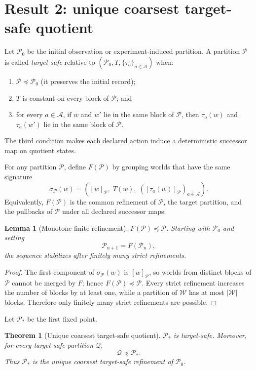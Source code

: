 \documentclass[11pt]{article}
\newtheorem{theorem}{Theorem}
\newtheorem{lemma}{Lemma}
\newcommand{\W}{\mathcal{W}}
\newcommand{\A}{\mathcal{A}}
\newcommand{\Pcal}{\mathcal{P}}
\newcommand{\Qcal}{\mathcal{Q}}
\begin{document}
\section{Result 2: unique coarsest target-safe quotient}
Let $\Pcal_0$ be the initial observation or experiment-induced partition. A partition $\Pcal$ is called \emph{target-safe} relative to $(\Pcal_0,T,\{\tau_a\}_{a\in\A})$ when:
\begin{enumerate}
\item $\Pcal\preceq\Pcal_0$ (it preserves the initial record);
\item $T$ is constant on every block of $\Pcal$; and
\item for every $a\in\A$, if $w$ and $w'$ lie in the same block of $\Pcal$, then $\tau_a(w)$ and $\tau_a(w')$ lie in the same block of $\Pcal$.
\end{enumerate}
The third condition makes each declared action induce a deterministic successor map on quotient states.

For any partition $\Pcal$, define $F(\Pcal)$ by grouping worlds that have the same signature
\[
\sigma_{\Pcal}(w)=
\left(
[w]_{\Pcal},\;T(w),\;([\tau_a(w)]_{\Pcal})_{a\in\A}
\right).
\]
Equivalently, $F(\Pcal)$ is the common refinement of $\Pcal$, the target partition, and the pullbacks of $\Pcal$ under all declared successor maps.

\begin{lemma}[Monotone finite refinement]
$F(\Pcal)\preceq\Pcal$. Starting with $\Pcal_0$ and setting
\[
\Pcal_{n+1}=F(\Pcal_n),
\]
the sequence stabilizes after finitely many strict refinements.
\end{lemma}

\begin{proof}
The first component of $\sigma_{\Pcal}(w)$ is $[w]_{\Pcal}$, so worlds from distinct blocks of $\Pcal$ cannot be merged by $F$; hence $F(\Pcal)\preceq\Pcal$. Every strict refinement increases the number of blocks by at least one, while a partition of $\W$ has at most $|\W|$ blocks. Therefore only finitely many strict refinements are possible.
\end{proof}

Let $\Pcal_*$ be the first fixed point.

\begin{theorem}[Unique coarsest target-safe quotient]
$\Pcal_*$ is target-safe. Moreover, for every target-safe partition $\Qcal$,
\[
\Qcal\preceq\Pcal_*.
\]
Thus $\Pcal_*$ is the unique coarsest target-safe refinement of $\Pcal_0$.
\end{theorem}
\end{document}
